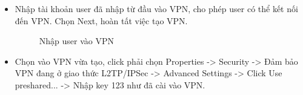     \begin{itemize}
        \item Nhập tài khoản user đã nhập từ đầu vào VPN, cho phép user có thể kết nối đến VPN. Chọn Next, hoàn tất việc tạo VPN.
        \begin{figure}[htbp]
            \hfill
            \hfill
            \caption{Nhập user vào VPN}
        \end{figure}
        \newpage
        \item Chọn vào VPN vừa tạo, click phải chọn Properties -> Security -> Đảm bảo VPN đang ở giao thức L2TP/IPSec -> Advanced Settings -> Click Use preshared... -> Nhập key 123 như đã cài vào VPN.
        



\end{itemize}
